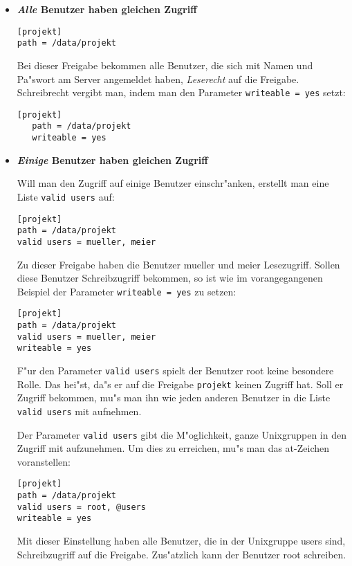 \documentclass{scrartcl}\usepackage{pslatex}\typearea{12}
\newcommand{\param}{\texttt}
\begin{document}
\begin{itemize}
\item {\bf \emph{Alle} Benutzer haben gleichen Zugriff}

\begin{verbatim}
[projekt]
path = /data/projekt
\end{verbatim}

Bei dieser Freigabe bekommen alle Benutzer, die sich mit Namen und
Pa"swort am Server angemeldet haben, \emph{Leserecht} auf die
Freigabe. Schreibrecht vergibt man, indem man den Parameter
\param{writeable = yes} setzt:

\begin{verbatim}
[projekt]
   path = /data/projekt
   writeable = yes
\end{verbatim}

\item {\bf \emph{Einige} Benutzer haben gleichen Zugriff}

Will man den Zugriff auf einige Benutzer einschr"anken, erstellt man
eine Liste \param{valid users} auf:

\begin{verbatim}
[projekt]
path = /data/projekt
valid users = mueller, meier
\end{verbatim}

Zu dieser Freigabe haben die Benutzer mueller und meier
Lesezugriff. Sollen diese Benutzer Schreibzugriff bekommen, so ist wie
im vorangegangenen Beispiel der Parameter \param{writeable = yes} zu
setzen:

\begin{verbatim}
[projekt]
path = /data/projekt
valid users = mueller, meier
writeable = yes
\end{verbatim}

F"ur den Parameter \param{valid users} spielt der Benutzer root keine
besondere Rolle. Das hei"st, da"s er auf die Freigabe \param{projekt}
keinen Zugriff hat. Soll er Zugriff bekommen, mu"s man ihn wie jeden
anderen Benutzer in die Liste \param{valid users} mit aufnehmen.

Der Parameter \param{valid users} gibt die M"oglichkeit, ganze
Unixgruppen in den Zugriff mit aufzunehmen. Um dies zu erreichen, mu"s
man das at-Zeichen voranstellen:

\begin{verbatim}
[projekt]
path = /data/projekt
valid users = root, @users
writeable = yes
\end{verbatim}

Mit dieser Einstellung haben alle Benutzer, die in der Unixgruppe
users sind, Schreibzugriff auf die Freigabe. Zus"atzlich kann der
Benutzer root schreiben.


\end{itemize}
\end{document}
